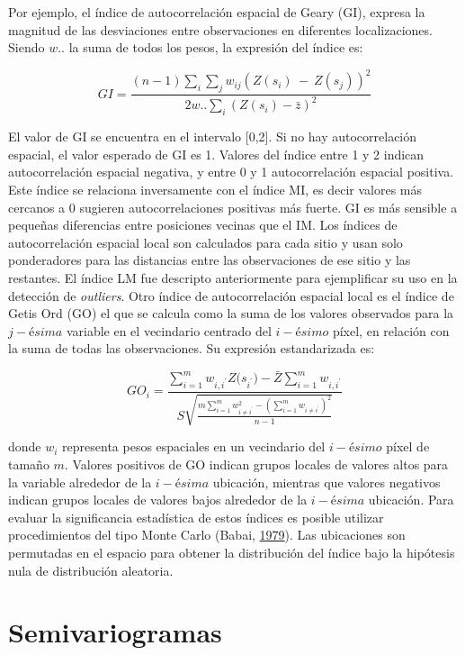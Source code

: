 \documentclass[11pt,b5paper,]{krantz}
\begin{document}
Por ejemplo, el índice de autocorrelación espacial de Geary (GI), expresa la magnitud de las desviaciones entre observaciones en diferentes localizaciones. Siendo \(w..\) la suma de todos los pesos, la expresión del índice es:

\[GI=\frac{(n-1)\sum_{i}\sum_{j}{w_{ij}(Z(s_i)\ -\ Z(s_j))^2}}{2w..\sum_{i}{(Z(s_i)-\bar{z})}^2}\]

El valor de GI se encuentra en el intervalo {[}0,2{]}. Si no hay autocorrelación espacial, el valor esperado de GI es 1. Valores del índice entre 1 y 2 indican autocorrelación espacial negativa, y entre 0 y 1 autocorrelación espacial positiva. Este índice se relaciona inversamente con el índice MI, es decir valores más cercanos a 0 sugieren autocorrelaciones positivas más fuerte. GI es más sensible a pequeñas diferencias entre posiciones vecinas que el IM. Los índices de autocorrelación espacial local son calculados para cada sitio y usan solo ponderadores para las distancias entre las observaciones de ese sitio y las restantes. El índice LM fue descripto anteriormente para ejemplificar su uso en la detección de \emph{outliers}. Otro índice de autocorrelación espacial local es el índice de Getis Ord (GO) el que se calcula como la suma de los valores observados para la \(j-ésima\) variable en el vecindario centrado del \(i-ésimo\) píxel, en relación con la suma de todas las observaciones. Su expresión estandarizada es:

\[{GO}_i=\frac{\sum_{i=1}^{m}{w_{i,i^\prime}{Z(s}_{i^\prime})-\bar{Z}\sum_{i=1}^{m}w_{i,i^\prime}}}{S\sqrt{\frac{m\sum_{i=1}^{m}{w_{i\neq i^\prime}^2-\left(\sum_{i=1}^{m}w_{i\neq i^\prime}\right)^2}}{n-1}}}\]

donde \(w_i\) representa pesos espaciales en un vecindario del \(i-ésimo\) píxel de tamaño \(m\). Valores positivos de GO indican grupos locales de valores altos para la variable alrededor de la \(i-ésima\) ubicación, mientras que valores negativos indican grupos locales de valores bajos alrededor de la \(i-ésima\) ubicación. Para evaluar la significancia estadística de estos índices es posible utilizar procedimientos del tipo Monte Carlo (Babai, \protect\hyperlink{ref-Babai_1979}{1979}). Las ubicaciones son permutadas en el espacio para obtener la distribución del índice bajo la hipótesis nula de distribución aleatoria.

\hypertarget{semivariogramas}{%
\section{Semivariogramas}\label{semivariogramas}}
\end{document}
